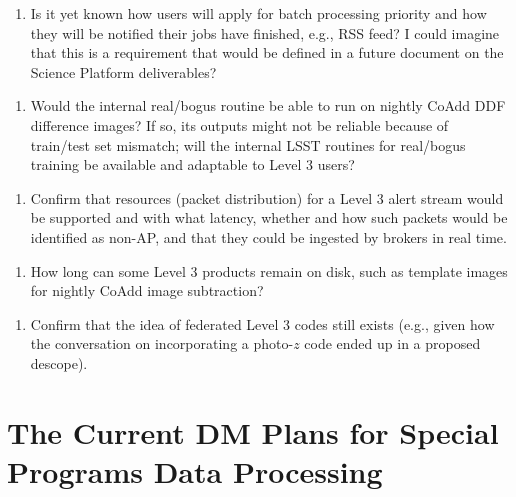 \documentclass[DM,lsstdraft,toc]{lsstdoc}
\begin{document}
\begin{enumerate}[resume,topsep=-10pt,label= \textbf{Concern \Roman*.}] \item \label{C15} Is it yet known how users will apply for batch processing priority and how they will be notified their jobs have finished, e.g., RSS feed? I could imagine that this is a requirement that would be defined in a future document on the Science Platform deliverables? \end{enumerate}
\begin{enumerate}[resume,topsep=-10pt,label= \textbf{Concern \Roman*.}] \item \label{C16} Would the internal real/bogus routine be able to run on nightly CoAdd DDF difference images? If so, its outputs might not be reliable because of train/test set mismatch; will the internal LSST routines for real/bogus training be available and adaptable to Level 3 users? \end{enumerate}
\begin{enumerate}[resume,topsep=-10pt,label= \textbf{Concern \Roman*.}] \item \label{C16a} Confirm that resources (packet distribution) for a Level 3 alert stream would be supported and with what latency, whether and how such packets would be identified as non-AP, and that they could be ingested by brokers in real time. \end{enumerate}
\begin{enumerate}[resume,topsep=-10pt,label= \textbf{Concern \Roman*.}] \item \label{C17} How long can some Level 3 products remain on disk, such as template images for nightly CoAdd image subtraction? \end{enumerate}
\begin{enumerate}[resume,topsep=-10pt,label= \textbf{Concern \Roman*.}] \item \label{C18} Confirm that the idea of federated Level 3 codes still exists (e.g., given how the conversation on incorporating a photo-$z$ code ended up in a proposed descope). \end{enumerate}



\clearpage
\section{The Current DM Plans for Special Programs Data Processing} \label{sec:dmdocs}
\end{document}
